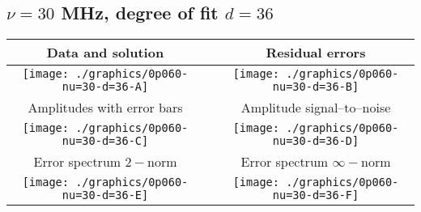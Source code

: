 

% 

\clearpage{}
\break{}

\subsection{$\nu = 30$ MHz, degree of fit $d = 36$}

\begin{table}[h]
    \begin{center}
        \begin{tabular}{ccc}
            Data and solution & \quad & Residual errors \\\hline
            \texttt{[image: ./graphics/0p060-nu=30-d=36-A]} &&
            \texttt{[image: ./graphics/0p060-nu=30-d=36-B]} \\[15pt]
            Amplitudes with error bars && Amplitude signal--to--noise \\\hline
            \texttt{[image: ./graphics/0p060-nu=30-d=36-C]} &&
            \texttt{[image: ./graphics/0p060-nu=30-d=36-D]} \\[15pt]
            Error spectrum $2-$norm && Error spectrum $\infty-$norm \\\hline
            \texttt{[image: ./graphics/0p060-nu=30-d=36-E]} &&
            \texttt{[image: ./graphics/0p060-nu=30-d=36-F]} \\[15pt]
        \end{tabular}
    \end{center}
\label{fig:elev=60, nu=30}
\end{table}



\endinput
